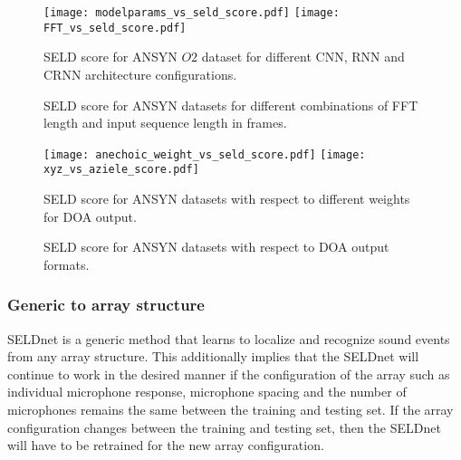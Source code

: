 \documentclass[journal]{IEEEtran}
\begin{document}
\begin{figure*}[!htb]
\centering	
    \texttt{[image: modelparams\_vs\_seld\_score.pdf]}
    \endminipage\hfill
    \texttt{[image: FFT\_vs\_seld\_score.pdf]}
    \endminipage\hfill
    
    \hspace{-15pt}
    \caption{SELD score for ANSYN $O2$ dataset for different CNN, RNN and CRNN architecture configurations.}
    \label{fig:modelparams}
    \endminipage \hspace{15pt}
    \caption{SELD score for ANSYN datasets for different combinations of FFT length and input sequence length in frames.}
    \label{fig:fft_seq_seld}
    \endminipage\hfill
    
    \vspace{20pt}
    \texttt{[image: anechoic\_weight\_vs\_seld\_score.pdf]}
    \endminipage\hfill
    \texttt{[image: xyz\_vs\_aziele\_score.pdf]}
    \endminipage\hfill
    
    \hspace{-15pt}
    \caption{SELD score for ANSYN datasets with respect to different weights for DOA output.}
    \label{fig:doa_wt}
    \endminipage \hspace{15pt}
    \caption{SELD score for ANSYN datasets with respect to DOA output formats.} 
    \label{fig:xyz_azi_ele}
    \endminipage \hfill
\end{figure*}




\subsubsection{Generic to array structure}
SELDnet is a generic method that learns to localize and recognize sound events from any array structure. This additionally implies that the SELDnet will continue to work in the desired manner if the configuration of the array such as individual microphone response, microphone spacing and the number of microphones remains the same between the training and testing set. If the array configuration changes between the training and testing set, then the SELDnet will have to be retrained for the new array configuration.
\end{document}
